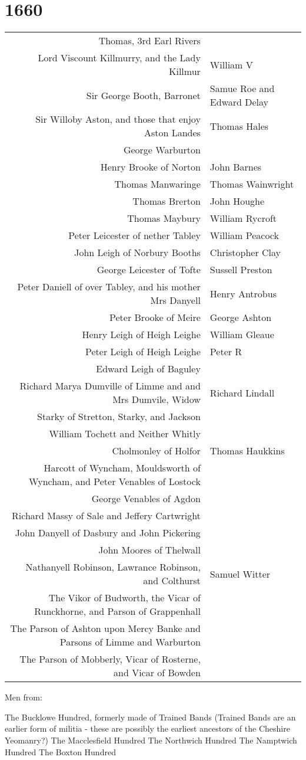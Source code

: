 \chapter*{1660}

\begin{center}
  \small
  \begin{tabular}{rl}
    Thomas, 3rd Earl Rivers & \\
    Lord Viscount Killmurry, and the Lady Killmur & William V \\
    Sir George Booth, Barronet & Samue Roe and Edward Delay \\
    Sir Willoby Aston, and those that enjoy Aston Landes & Thomas Hales \\
    George Warburton & \\
    Henry Brooke of Norton & John Barnes \\
    Thomas Manwaringe & Thomas Wainwright \\
    Thomas Brerton & John Houghe \\
    Thomas Maybury & William Rycroft \\
    Peter Leicester of nether Tabley & William Peacock \\
    John Leigh of Norbury Booths & Christopher Clay \\
    George Leicester of Tofte & Sussell Preston \\
    Peter Daniell of over Tabley, and his mother Mrs Danyell & Henry Antrobus \\
    Peter Brooke of Meire & George Ashton \\
    Henry Leigh of Heigh Leighe & William Gleaue \\
    Peter Leigh of Heigh Leighe & Peter R \\
    Edward Leigh of Baguley & \\
    Richard Marya Dumville of Limme and and Mrs Dumvile, Widow & Richard Lindall \\
    Starky of Stretton, Starky, and Jackson & \\
    William Tochett and Neither Whitly & \\
    Cholmonley of Holfor & Thomas Haukkins \\
    Harcott of Wyncham, Mouldsworth of Wyncham, and Peter Venables of Lostock & \\
    George Venables of Agdon & \\
    Richard Massy of Sale and Jeffery Cartwright & \\
    John Danyell of Dasbury and John Pickering & \\
    John Moores of Thelwall & \\
    Nathanyell Robinson, Lawrance Robinson, and Colthurst & Samuel Witter \\
    The Vikor of Budworth, the Vicar of Runckhorne, and Parson of Grappenhall & \\
    The Parson of Ashton upon Mercy Banke and Parsons of Limme and Warburton & \\
    The Parson of Mobberly, Vicar of Rosterne, and Vicar of Bowden & \\
  \end{tabular}
\end{center}




Men from:

The Bucklowe Hundred, formerly made of Trained Bands (Trained Bands are an earlier form of militia - these are possibly the earliest ancestors of the Cheshire Yeomanry?)
The Macclesfield Hundred
The Northwich Hundred
The Namptwich Hundred
The Boxton Hundred

